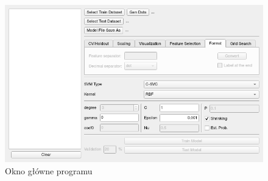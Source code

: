 \documentclass[paper=a4, fontsize=11pt]{scrartcl} %
\numberwithin{equation}{section} %
\numberwithin{figure}{section} %
\begin{document}
    \begin{figure}[h]
        \begin{center}
            \includegraphics[scale=0.7]{./img/svm_app_main_window.png}
            \caption{Okno główne programu}
            \label{fig:main_window}
        \end{center}
    \end{figure}

\newpage %
\end{document}
